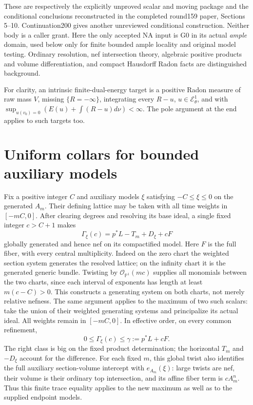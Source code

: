 \documentclass[11pt]{article}
\newcommand{\EE}{\mathcal E^1_\theta}
\begin{document}
These are respectively the explicitly unproved scalar and moving
package and the conditional conclusions reconstructed in the completed
round159 paper, Sections 5--10. Continuation200 gives another unreviewed
conditional construction. Neither body is a caller grant.
Here the only accepted NA input is G0 in its actual \emph{ample} domain,
used below only for finite bounded ample locality and original model
testing. Ordinary resolution, nef intersection theory, algebraic positive
products and volume differentiation, and compact Hausdorff Radon facts
are distinguished background.

For clarity, an intrinsic finite-dual-energy target is a positive Radon
measure of raw mass $V$, missing $\{R=-\infty\}$, integrating every
$R-u$, $u\in\EE$, and with
$\sup_{u(v_0)=0}(E(u)+\int(R-u)d\nu)<\infty$.
The pole argument at the end applies to such targets too.

\section{Uniform collars for bounded auxiliary models}
Fix a positive integer $C$ and auxiliary models $\xi$ satisfying
$-C\leq\xi\leq0$ on the generated $A_m$.
Their defining lattice may be taken with all time weights in $[-mC,0]$.
After clearing degrees and resolving its base ideal, a single fixed
integer $c>C+1$ makes
\[
 \Gamma_\xi(c)=p^*L-T_m+D_\xi+cF
\]
globally generated and hence nef on its compactified model.
Here $F$ is the full fiber, with every central multiplicity.
Indeed on the zero chart the weighted section system generates the
resolved lattice; on the infinity chart it is the generated generic
bundle. Twisting by $\mathcal O_{\mathbb P^1}(mc)$ supplies all
monomials between the two charts, since each interval of exponents
has length at least $m(c-C)>0$. This constructs a generating system
on both charts, not merely relative nefness.
The same argument applies to the maximum of two such scalars:
take the union of their weighted generating systems and principalize
its actual ideal. All weights remain in $[-mC,0]$.
In effective order, on every common refinement,
\[
 0\leq\Gamma_\xi(c)\leq\gamma:=p^*L+cF.                  \tag{2}
\]
The right class is big on the fixed product determination; the
horizontal $T_m$ and $-D_\xi$ account for the difference.
For each fixed $m$, this global twist also identifies the full
auxiliary section-volume intercept with $e_{A_m}(\xi)$:
large twists are nef, their volume is their ordinary top intersection,
and its affine fiber term is $cA_m^n$. Thus this finite trace equality
applies to the new maximum as well as to the supplied endpoint models.
\end{document}
